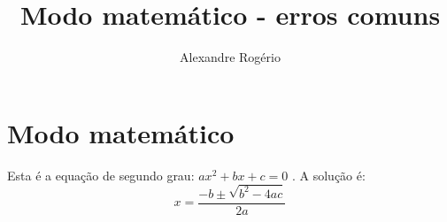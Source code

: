 \documentclass{article}
\begin{document}
	
	\title{\textbf{{\Huge Modo matemático - erros comuns}}}
	\author{Alexandre Rogério}
	\maketitle
	\thispagestyle{empty} %
	\newpage
	
	\setcounter{page}{1}
	\tableofcontents
	\newpage
	
	\listoffigures
	\newpage
	
	\listoftables
	\newpage
	
	\setcounter{page}{1}
	
	\section{Modo matemático}
	Esta é a equação de segundo grau: $ ax^2 + bx + c = 0 $ . A solução é:
	\begin{equation*}
		x = \frac{-b \pm \sqrt{b^2 - 4ac}}{2a}
	\end{equation*}
\end{document}
